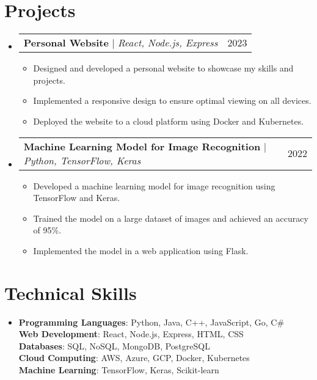 \documentclass[letterpaper,11pt]{article}
\makeatletter
\newcommand{\resumeItem}[1]{
\item\small{
{#1 \vspace{-2pt}}
}
}
\newcommand{\resumeProjectHeading}[2]{
\item
\begin{tabular*}{0.97\textwidth}{l@{\extracolsep{\fill}}r}
\small#1 & #2 \\
\end{tabular*}\vspace{-7pt}
}
\newcommand{\resumeSubHeadingListStart}{\begin{itemize}[leftmargin=0.15in, label={}]}
\newcommand{\resumeSubHeadingListEnd}{\end{itemize}}
\newcommand{\resumeItemListStart}{\begin{itemize}}
\newcommand{\resumeItemListEnd}{\end{itemize}\vspace{-5pt}}
\makeatother
\begin{document}
\section{Projects}
\resumeSubHeadingListStart
\resumeProjectHeading{\textbf{Personal Website} $|$ \emph{React, Node.js, Express}}{2023}
\resumeItemListStart
\resumeItem{Designed and developed a personal website to showcase my skills and projects.}
\resumeItem{Implemented a responsive design to ensure optimal viewing on all devices.}
\resumeItem{Deployed the website to a cloud platform using Docker and Kubernetes.}
\resumeItemListEnd
\resumeProjectHeading{\textbf{Machine Learning Model for Image Recognition} $|$ \emph{Python, TensorFlow, Keras}}{2022}
\resumeItemListStart
\resumeItem{Developed a machine learning model for image recognition using TensorFlow and Keras.}
\resumeItem{Trained the model on a large dataset of images and achieved an accuracy of 95\%.}
\resumeItem{Implemented the model in a web application using Flask.}
\resumeItemListEnd
\resumeSubHeadingListEnd

\section{Technical Skills} %
\begin{itemize}[leftmargin=0.15in, label={}]
\item{
\textbf{Programming Languages}{: Python, Java, C++, JavaScript, Go, C\#} \\
\textbf{Web Development}{: React, Node.js, Express, HTML, CSS} \\
\textbf{Databases}{: SQL, NoSQL, MongoDB, PostgreSQL} \\
\textbf{Cloud Computing}{: AWS, Azure, GCP, Docker, Kubernetes} \\
\textbf{Machine Learning}{: TensorFlow, Keras, Scikit-learn}
} \\
\end{itemize}


\end{document}
